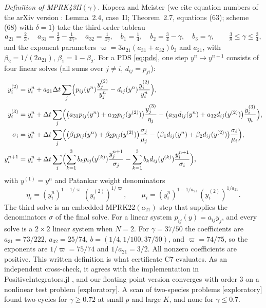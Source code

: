 \documentclass[11pt,a4paper]{article}
\theoremstyle{plain}
\theoremstyle{definition}
\newcommand{\status}[1]{\textsf{[#1]}}
\begin{document}
\emph{Definition of MPRK43II$(\gamma)$}\label{sec:mprk43def}. Kopecz and Meister \cite{KM2018b} (we cite equation numbers of the arXiv version \cite{KM2017arxiv}: Lemma~2.4, case~II; Theorem~2.7, equations (63); scheme (68) with $\delta=1$) take the third-order tableau
\[
 a_{21}=\tfrac23,\quad a_{31}=\tfrac23-\tfrac1{4\gamma},\quad a_{32}=\tfrac1{4\gamma},\quad b_1=\tfrac14,\quad b_2=\tfrac34-\gamma,\quad b_3=\gamma,\qquad \tfrac38\le\gamma\le\tfrac34,
\]
and the exponent parameters $\varpi=3a_{21}(a_{31}+a_{32})b_3$ and $a_{21}$, with $\beta_2=1/(2a_{21})$, $\beta_1=1-\beta_2$. For a PDS \eqref{eq:pds}, one step $y^n\mapsto y^{n+1}$ consists of four linear solves (all sums over $j\ne i$, $d_{ij}=p_{ji}$):
\begin{align*}
 y^{(2)}_i&=y^n_i+a_{21}\Delta t\sum_j\Bigl(p_{ij}(y^n)\frac{y^{(2)}_j}{y^n_j}-d_{ij}(y^n)\frac{y^{(2)}_i}{y^n_i}\Bigr),\\
 y^{(3)}_i&=y^n_i+\Delta t\sum_j\Bigl(\bigl(a_{31}p_{ij}(y^n)+a_{32}p_{ij}(y^{(2)})\bigr)\frac{y^{(3)}_j}{\eta_j}-\bigl(a_{31}d_{ij}(y^n)+a_{32}d_{ij}(y^{(2)})\bigr)\frac{y^{(3)}_i}{\eta_i}\Bigr),\\
 \sigma_i&=y^n_i+\Delta t\sum_j\Bigl(\bigl(\beta_1p_{ij}(y^n)+\beta_2p_{ij}(y^{(2)})\bigr)\frac{\sigma_j}{\mu_j}-\bigl(\beta_1d_{ij}(y^n)+\beta_2d_{ij}(y^{(2)})\bigr)\frac{\sigma_i}{\mu_i}\Bigr),\\
 y^{n+1}_i&=y^n_i+\Delta t\sum_j\Bigl(\sum_{k=1}^3b_kp_{ij}(y^{(k)})\frac{y^{n+1}_j}{\sigma_j}-\sum_{k=1}^3b_kd_{ij}(y^{(k)})\frac{y^{n+1}_i}{\sigma_i}\Bigr),
\end{align*}
with $y^{(1)}=y^n$ and Patankar weight denominators
\[
 \eta_i=(y^n_i)^{1-1/\varpi}\,(y^{(2)}_i)^{1/\varpi},\qquad \mu_i=(y^n_i)^{1-1/a_{21}}\,(y^{(2)}_i)^{1/a_{21}} .
\]
The third solve is an embedded MPRK22$(a_{21})$ step that supplies the denominators $\sigma$ of the final solve. For a linear system $p_{ij}(y)=a_{ij}y_j$, and every solve is a $2\times2$ linear system when $N=2$. For $\gamma=37/50$ the coefficients are $a_{31}=73/222$, $a_{32}=25/74$, $b=(1/4,1/100,37/50)$, and $\varpi=74/75$, so the exponents are $1/\varpi=75/74$ and $1/a_{21}=3/2$. All nonzero coefficients are positive. This written definition is what certificate C7 evaluates. As an independent cross-check, it agrees with the implementation in PositiveIntegrators.jl \cite{PosInt}, and our floating-point version converges with order $3$ on a nonlinear test problem \status{exploratory}. A scan of two-species problems \status{exploratory} found two-cycles for $\gamma\ge0.72$ at small $p$ and large $K$, and none for $\gamma\le0.7$.
\end{document}
